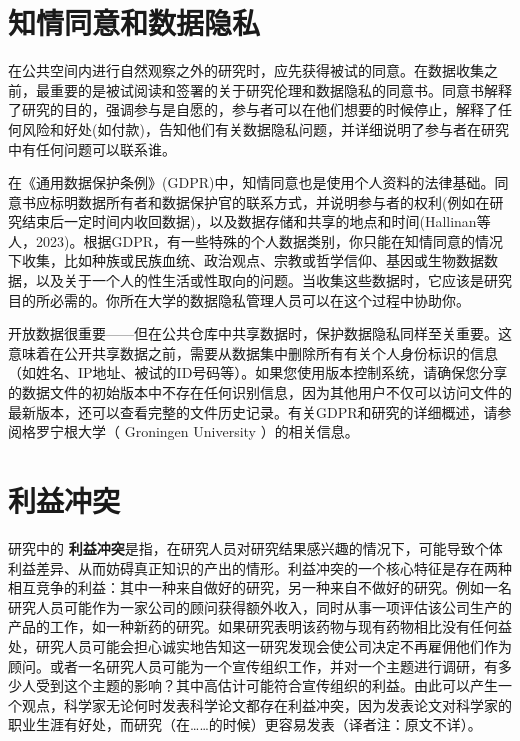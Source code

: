 \documentclass[
  letterpaper,
  DIV=11,
  numbers=noendperiod]{scrreprt}
\begin{document}
\hypertarget{ux77e5ux60c5ux540cux610fux548cux6570ux636eux9690ux79c1}{%
\section{知情同意和数据隐私}\label{ux77e5ux60c5ux540cux610fux548cux6570ux636eux9690ux79c1}}

在公共空间内进行自然观察之外的研究时，应先获得被试的同意。在数据收集之前，最重要的是被试阅读和签署的关于研究伦理和数据隐私的同意书。同意书解释了研究的目的，强调参与是自愿的，参与者可以在他们想要的时候停止，解释了任何风险和好处(如付款)，告知他们有关数据隐私问题，并详细说明了参与者在研究中有任何问题可以联系谁。

在《通用数据保护条例》(GDPR)中，知情同意也是使用个人资料的法律基础。同意书应标明数据所有者和数据保护官的联系方式，并说明参与者的权利(例如在研究结束后一定时间内收回数据)，以及数据存储和共享的地点和时间(Hallinan等人，2023)。根据GDPR，有一些特殊的个人数据类别，你只能在知情同意的情况下收集，比如种族或民族血统、政治观点、宗教或哲学信仰、基因或生物数据数据，以及关于一个人的性生活或性取向的问题。当收集这些数据时，它应该是研究目的所必需的。你所在大学的数据隐私管理人员可以在这个过程中协助你。

开放数据很重要------但在公共仓库中共享数据时，保护数据隐私同样至关重要。这意味着在公开共享数据之前，需要从数据集中删除所有有关个人身份标识的信息（如姓名、IP地址、被试的ID号码等）。如果您使用版本控制系统，请确保您分享的数据文件的初始版本中不存在任何识别信息，因为其他用户不仅可以访问文件的最新版本，还可以查看完整的文件历史记录。有关GDPR和研究的详细概述，请参阅格罗宁根大学（
Groningen University ）的相关信息。

\hypertarget{ux5229ux76caux51b2ux7a81}{%
\section{利益冲突}\label{ux5229ux76caux51b2ux7a81}}

研究中的
\textbf{利益冲突}是指，在研究人员对研究结果感兴趣的情况下，可能导致个体利益差异、从而妨碍真正知识的产出的情形。利益冲突的一个核心特征是存在两种相互竞争的利益：其中一种来自做好的研究，另一种来自不做好的研究。例如一名研究人员可能作为一家公司的顾问获得额外收入，同时从事一项评估该公司生产的产品的工作，如一种新药的研究。如果研究表明该药物与现有药物相比没有任何益处，研究人员可能会担心诚实地告知这一研究发现会使公司决定不再雇佣他们作为顾问。或者一名研究人员可能为一个宣传组织工作，并对一个主题进行调研，有多少人受到这个主题的影响？其中高估计可能符合宣传组织的利益。由此可以产生一个观点，科学家无论何时发表科学论文都存在利益冲突，因为发表论文对科学家的职业生涯有好处，而研究（在\ldots\ldots 的时候）更容易发表（译者注：原文不详）。
\end{document}
